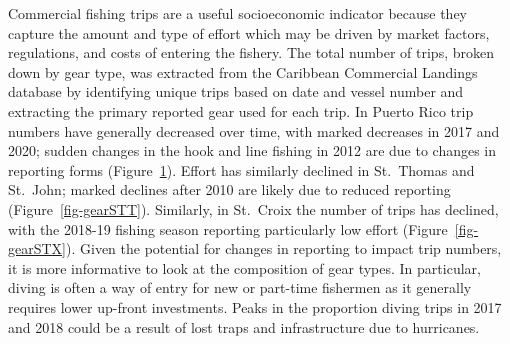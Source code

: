 \documentclass[
  letterpaper,
  oneside,
  open=any]{scrbook}
\begin{document}
Commercial fishing trips are a useful socioeconomic indicator because
they capture the amount and type of effort which may be driven by market
factors, regulations, and costs of entering the fishery. The total
number of trips, broken down by gear type, was extracted from the
Caribbean Commercial Landings database by identifying unique trips based
on date and vessel number and extracting the primary reported gear used
for each trip. In Puerto Rico trip numbers have generally decreased over
time, with marked decreases in 2017 and 2020; sudden changes in the hook
and line fishing in 2012 are due to changes in reporting forms
(Figure~\ref{fig-gearPR}). Effort has similarly declined in St.~Thomas
and St.~John; marked declines after 2010 are likely due to reduced
reporting (Figure~\ref{fig-gearSTT}). Similarly, in St.~Croix the number
of trips has declined, with the 2018-19 fishing season reporting
particularly low effort (Figure~\ref{fig-gearSTX}). Given the potential
for changes in reporting to impact trip numbers, it is more informative
to look at the composition of gear types. In particular, diving is often
a way of entry for new or part-time fishermen as it generally requires
lower up-front investments. Peaks in the proportion diving trips in 2017
and 2018 could be a result of lost traps and infrastructure due to
hurricanes.

\begin{figure}


\caption{\label{fig-gearPR}}

\end{figure}%
\end{document}
